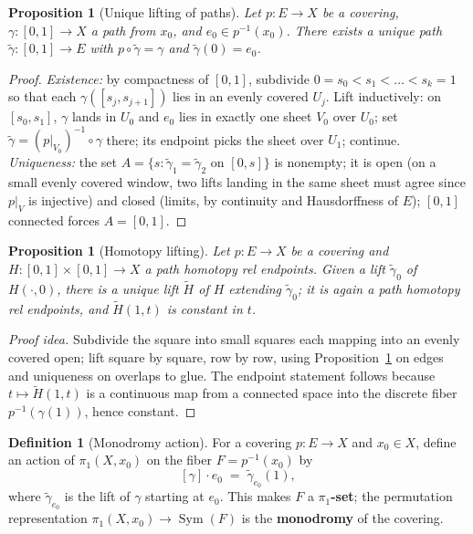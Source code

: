 \documentclass[11pt,a4paper]{article}
\newtheorem{proposition}[theorem]{Proposition}
\theoremstyle{definition}
\newtheorem{definition}[theorem]{Definition}
\newcommand{\Sym}{\operatorname{Sym}}
\begin{document}
	\begin{proposition}[Unique lifting of paths]\label{prop:path-lifting}
		Let $p:E\to X$ be a covering, $\gamma:[0,1]\to X$ a path from $x_0$, and $e_0\in p^{-1}(x_0)$.
		There exists a unique path $\tilde\gamma:[0,1]\to E$ with $p\circ\tilde\gamma=\gamma$ and
		$\tilde\gamma(0)=e_0$.
	\end{proposition}
	\begin{proof}
		\emph{Existence:} by compactness of $[0,1]$, subdivide $0=s_0<s_1<\dots<s_k=1$ so that each
		$\gamma([s_j,s_{j+1}])$ lies in an evenly covered $U_j$. Lift inductively: on $[s_0,s_1]$, $\gamma$
		lands in $U_0$ and $e_0$ lies in exactly one sheet $V_0$ over $U_0$; set
		$\tilde\gamma=(p|_{V_0})^{-1}\circ\gamma$ there; its endpoint picks the sheet over $U_1$; continue.
		\emph{Uniqueness:} the set $A=\{s:\tilde\gamma_1=\tilde\gamma_2 \text{ on } [0,s]\}$ is nonempty; it is
		open (on a small evenly covered window, two lifts landing in the same sheet must agree since
		$p|_V$ is injective) and closed (limits, by continuity and Hausdorffness of $E$); $[0,1]$ connected
		forces $A=[0,1]$.
	\end{proof}
	
	\begin{proposition}[Homotopy lifting]\label{prop:homotopy-lifting}
		Let $p:E\to X$ be a covering and $H:[0,1]\times[0,1]\to X$ a path homotopy rel endpoints. Given a
		lift $\tilde\gamma_0$ of $H(\cdot,0)$, there is a unique lift $\tilde H$ of $H$ extending
		$\tilde\gamma_0$; it is again a path homotopy rel endpoints, and $\tilde H(1,t)$ is constant in $t$.
	\end{proposition}
	\begin{proof}[Proof idea]
		Subdivide the square into small squares each mapping into an evenly covered open; lift square by
		square, row by row, using Proposition~\ref{prop:path-lifting} on edges and uniqueness on overlaps to
		glue. The endpoint statement follows because $t\mapsto\tilde H(1,t)$ is a continuous map from a
		connected space into the discrete fiber $p^{-1}(\gamma(1))$, hence constant.
	\end{proof}
	
	\begin{definition}[Monodromy action]\label{def:monodromy}
		For a covering $p:E\to X$ and $x_0\in X$, define an action of $\pi_1(X,x_0)$ on the fiber
		$F=p^{-1}(x_0)$ by
		\[
		[\gamma]\cdot e_0 \;=\; \tilde\gamma_{e_0}(1),
		\]
		where $\tilde\gamma_{e_0}$ is the lift of $\gamma$ starting at $e_0$. This makes $F$ a
		\textbf{$\pi_1$-set}; the permutation representation $\pi_1(X,x_0)\to\Sym(F)$ is the
		\textbf{monodromy} of the covering.
	\end{definition}
	
\end{document}
